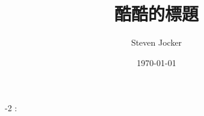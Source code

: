 \documentclass[11pt]{article}
\title{酷酷的標題}
\author{Steven Jocker}
\date{\today}
\begin{document}
\maketitle
{}-2 : \\
\end{document}
